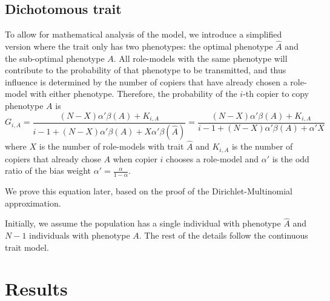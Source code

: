 \documentclass[12pt]{extarticle}
\begin{document}
\subsection*{Dichotomous trait}
To allow for mathematical analysis of the model, we introduce a simplified version where the trait only has two phenotypes: the optimal phenotype $\hat{A}$ and the sub-optimal phenotype $A$. 
All role-models with the same phenotype will contribute to the probability of that phenotype to be transmitted, and thus influence is determined by the number of copiers that have already chosen a role-model with either phenotype.
Therefore, the probability of the $i$-th copier to copy phenotype $A$ is
\begin{equation}\label{eq:binary-model}
G_{i,A} = \frac{(N-X)\alpha'\beta(A) + K_{i,A}}{i-1 + (N-X)\alpha'\beta(A) + X\alpha'\beta(\hat{A})} = \frac{(N-X)\alpha'\beta(A) + K_{i,A}}{i-1 + (N-X)\alpha'\beta(A) + \alpha'X}
\end{equation}
where $X$ is the number of role-models with trait $\hat{A}$ and $K_{i,A}$ is the number of copiers that already chose $A$ when copier $i$ chooses a role-model and $\alpha'$ is the odd ratio of the bias weight $\alpha'= \frac{\alpha}{1-\alpha}$.

We prove this equation later, based on the proof of the Dirichlet-Multinomial approximation.

Initially, we assume the population has a single individual with phenotype $\hat{A}$ and $N-1$ individuals with phenotype $A$. The rest of the details follow the continuous trait model.

\section*{Results}
\end{document}

